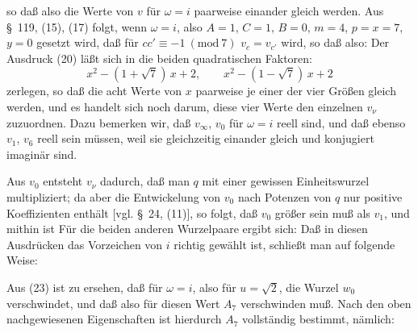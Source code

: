 so daß also die Werte von $v$ für $\omega = i$ paarweise einander
gleich werden. Aus \S\ 119, (15), (17) folgt, wenn $\omega = i$,
also $A=1$, $C=1$, $B=0$, $m=4$, $p=x=7$, $y=0$ gesetzt wird, daß
für $cc' \equiv -1 \ (\mathrm{mod}\ 7)$ $v_c = v_{c'}$ wird, so daß
also:
Der Ausdruck (20) läßt sich in die beiden quadratischen Faktoren:
\[
x^2 - (1+\sqrt{7})\, x + 2, \qquad x^2 - (1-\sqrt{7})\, x + 2
\]
zerlegen, so daß die acht Werte von $x$ paarweise je einer der vier
Größen
gleich werden, und es handelt sich noch darum, diese vier Werte
den einzelnen $v_\nu$ zuzuordnen. Dazu bemerken wir, daß $v_\infty$,
$v_0$ für $\omega = i$ reell sind, und daß ebenso $v_1$, $v_6$ reell
sein müssen, weil sie gleichzeitig einander gleich und konjugiert
imaginär sind.

Aus $v_0$ entsteht $v_\nu$ dadurch, daß man $q$ mit einer gewissen
Einheitswurzel multipliziert; da aber die Entwickelung von $v_0$
nach Potenzen von $q$ nur positive Koeffizienten enthält [vgl.
\S\ 24, (11)], so folgt, daß $v_0$ größer sein muß als $v_1$, und
mithin ist
Für die beiden anderen Wurzelpaare ergibt sich:
Daß in diesen Ausdrücken das Vorzeichen von $i$ richtig gewählt
ist, schließt man auf folgende Weise:

Aus (23) ist zu ersehen, daß für $\omega = i$, also für
$u = \sqrt{2}$, die Wurzel $w_0$ verschwindet, und daß also für
diesen Wert $A_7$ verschwinden muß. Nach den oben nachgewiesenen
Eigenschaften ist hierdurch $A_7$ vollständig bestimmt, nämlich:
